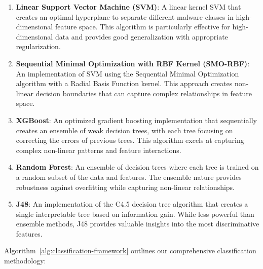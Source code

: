 \begin{enumerate}
    \item \textbf{Linear Support Vector Machine (SVM)}: A linear kernel SVM that creates an optimal hyperplane to separate different malware classes in high-dimensional feature space. This algorithm is particularly effective for high-dimensional data and provides good generalization with appropriate regularization.
    
    \item \textbf{Sequential Minimal Optimization with RBF Kernel (SMO-RBF)}: An implementation of SVM using the Sequential Minimal Optimization algorithm with a Radial Basis Function kernel. This approach creates non-linear decision boundaries that can capture complex relationships in feature space.
    
    \item \textbf{XGBoost}: An optimized gradient boosting implementation that sequentially creates an ensemble of weak decision trees, with each tree focusing on correcting the errors of previous trees. This algorithm excels at capturing complex non-linear patterns and feature interactions.
    
    \item \textbf{Random Forest}: An ensemble of decision trees where each tree is trained on a random subset of the data and features. The ensemble nature provides robustness against overfitting while capturing non-linear relationships.
    
    \item \textbf{J48}: An implementation of the C4.5 decision tree algorithm that creates a single interpretable tree based on information gain. While less powerful than ensemble methods, J48 provides valuable insights into the most discriminative features.
\end{enumerate}

Algorithm~\ref{alg:classification-framework} outlines our comprehensive classification methodology:

